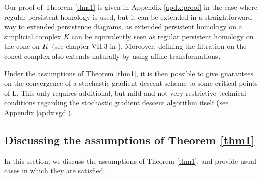 \begin{remark}
    Our proof of Theorem \ref{thm1} is given in Appendix \ref{apdx:proof} in the case where regular persistent homology is used, but it can be extended in a straightforward way to extended persistence diagrams, as extended persistent homology on a simplicial complex $K$ can be equivalently seen as regular persistent homology on the cone on $K$~(see chapter VII.3 in \cite{edelsbrunner2022computational}). Moreover, defining the filtration on the coned complex also extends naturally by using affine transformations.
\end{remark}

Under the assumptions of Theorem \ref{thm1}, it is then possible to give guarantees on the convergence of a stochastic gradient descent scheme to some critical points of $\text{L}$. This only requires additional, but mild and not very restrictive technical conditions regarding the stochastic gradient descent algorithm itself (see Appendix \ref{apdx:sgd}). 




\subsection{Discussing the assumptions of Theorem \ref{thm1}}
In this section, we discuss the assumptions of Theorem \ref{thm1}, and provide usual cases in which they are satisfied. %

